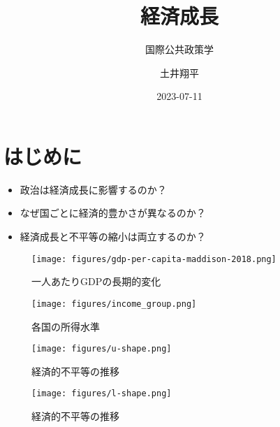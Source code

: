 \documentclass[
  xelatex,
  ja=standard]{bxjsarticle}
\title{経済成長}
\subtitle{国際公共政策学}
\author{土井翔平}
\date{2023-07-11}
\providecommand{\tightlist}{%
  \setlength{\itemsep}{0pt}\setlength{\parskip}{0pt}}\usepackage{longtable,booktabs,array}
\begin{document}
\maketitle
\ifdefined\Shaded\renewenvironment{Shaded}{\begin{tcolorbox}[breakable, interior hidden, borderline west={3pt}{0pt}{shadecolor}, enhanced, boxrule=0pt, frame hidden, sharp corners]}{\end{tcolorbox}}\fi

\hypertarget{ux306fux3058ux3081ux306b}{%
\section*{はじめに}\label{ux306fux3058ux3081ux306b}}

\begin{itemize}
\tightlist
\item
  政治は経済成長に影響するのか？
\item
  なぜ国ごとに経済的豊かさが異なるのか？
\item
  経済成長と不平等の縮小は両立するのか？
\end{itemize}

\begin{figure}[htpb]

{\centering \texttt{[image: figures/gdp-per-capita-maddison-2018.png]}

}

\caption{一人あたりGDPの長期的変化}

\end{figure}

\begin{figure}[htpb]

{\centering \texttt{[image: figures/income\_group.png]}

}

\caption{各国の所得水準}

\end{figure}

\begin{figure}[htpb]

{\centering \texttt{[image: figures/u-shape.png]}

}

\caption{経済的不平等の推移}

\end{figure}

\begin{figure}[htpb]

{\centering \texttt{[image: figures/l-shape.png]}

}

\caption{経済的不平等の推移}

\end{figure}
\end{document}
